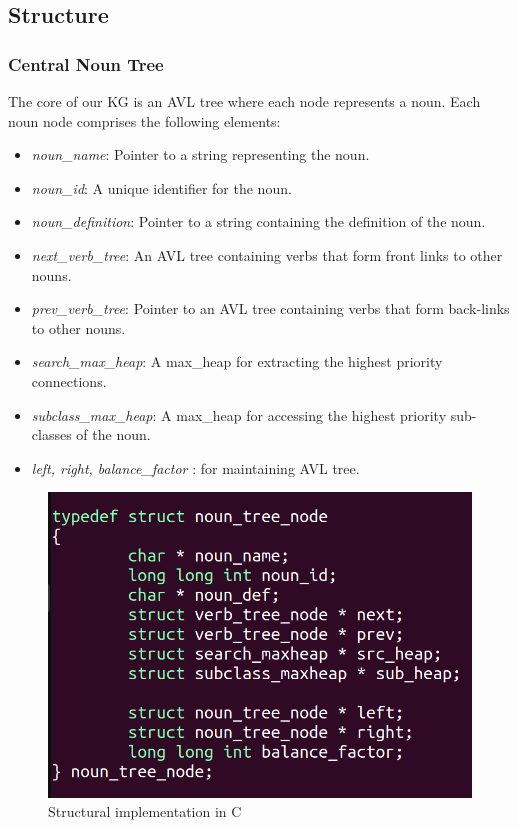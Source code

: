 \documentclass[conference]{IEEEtran}
\begin{document}
\subsection{Structure}

\subsubsection{\textbf{Central Noun Tree}}
The core of our KG is an AVL tree where each node represents a noun. Each noun node comprises the following elements:
\begin{itemize}

    \item \textit{noun\_name}: Pointer to a string representing the noun.
    \item \textit{noun\_id}: A unique identifier for the noun.
    \item \textit{noun\_definition}: Pointer to a string containing the definition of the noun.
    \item \textit{next\_verb\_tree}: An AVL tree containing verbs that form front links to other nouns.
    \item \textit{prev\_verb\_tree}: Pointer to an AVL tree containing verbs that form back-links to other nouns.
    \item \textit{search\_max\_heap}: A max\_heap for extracting the highest priority connections.
    \item \textit{subclass\_max\_heap}: A max\_heap for accessing the highest priority sub-classes of the noun.
    \item \textit{left, right, balance\_factor} : for maintaining AVL tree. 
    
\end{itemize}

\begin{figure}[htbp]
\centering
\includegraphics[width=0.8\linewidth]{c1.png} %
\caption{Structural implementation in C}
\label{fig}
\end{figure}
\end{document}
